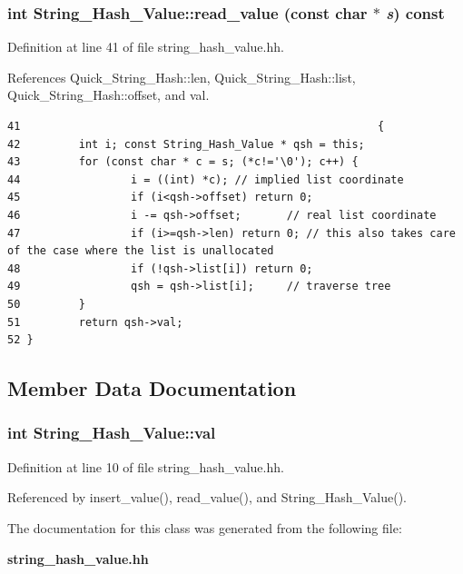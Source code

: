 \subsubsection{\setlength{\rightskip}{0pt plus 5cm}int String\_\-Hash\_\-Value::read\_\-value (const char $\ast$ {\em s}) const}\label{classString__Hash__Value_a2}




Definition at line 41 of file string\_\-hash\_\-value.hh.

References Quick\_\-String\_\-Hash::len, Quick\_\-String\_\-Hash::list, Quick\_\-String\_\-Hash::offset, and val.



\footnotesize\begin{verbatim}41                                                       {
42         int i; const String_Hash_Value * qsh = this;
43         for (const char * c = s; (*c!='\0'); c++) {
44                 i = ((int) *c); // implied list coordinate
45                 if (i<qsh->offset) return 0;
46                 i -= qsh->offset;       // real list coordinate
47                 if (i>=qsh->len) return 0; // this also takes care of the case where the list is unallocated
48                 if (!qsh->list[i]) return 0;
49                 qsh = qsh->list[i];     // traverse tree
50         }
51         return qsh->val;
52 }
\end{verbatim}\normalsize 


\subsection{Member Data Documentation}
\subsubsection{\setlength{\rightskip}{0pt plus 5cm}int String\_\-Hash\_\-Value::val\hspace{0.3cm}{\tt  [protected]}}\label{classString__Hash__Value_n0}




Definition at line 10 of file string\_\-hash\_\-value.hh.

Referenced by insert\_\-value(), read\_\-value(), and String\_\-Hash\_\-Value().

The documentation for this class was generated from the following file:\begin{CompactItemize}
\item 
{\bf string\_\-hash\_\-value.hh}\end{CompactItemize}
